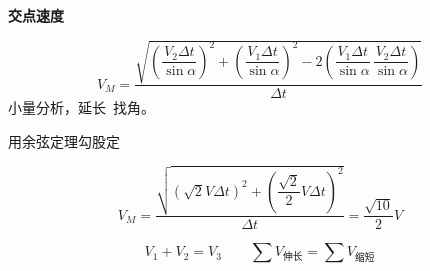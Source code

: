 \textbf{交点速度}%

\[
V_M=\frac{\sqrt{\left(\dfrac{V_2\Delta t}{\sin\alpha}\right)^{2}+\left(\dfrac{V_1\Delta t}{\sin\alpha}\right)^{2}-2\left(\dfrac{V_1\Delta t}{\sin\alpha}\,\dfrac{V_2\Delta t}{\sin\alpha}\right)}}{\Delta t}
\]%
小量分析，延长\ 找角。


\noindent 用余弦定理\quad 勾股定%

\[
V_M=\frac{\sqrt{\left(\sqrt2V\Delta t\right)^{2}+\left(\dfrac{\sqrt2}{2}V\Delta t\right)^{2}}}{\Delta t}=\frac{\sqrt{10}}{2}V
\]%
\begin{keybox}[伸缩等速]%
\[
V_1+V_2=V_3\qquad \sum V_{\text{伸长}}=\sum V_{\text{缩短}}
\]
\end{keybox}

